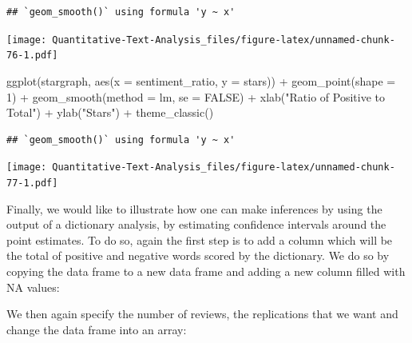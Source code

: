 \documentclass[
]{book}
\newenvironment{Shaded}{\begin{snugshade}}{\end{snugshade}}
\newcommand{\AttributeTok}[1]{\textcolor[rgb]{0.77,0.63,0.00}{#1}}
\newcommand{\ConstantTok}[1]{\textcolor[rgb]{0.00,0.00,0.00}{#1}}
\newcommand{\DecValTok}[1]{\textcolor[rgb]{0.00,0.00,0.81}{#1}}
\newcommand{\FunctionTok}[1]{\textcolor[rgb]{0.00,0.00,0.00}{#1}}
\newcommand{\NormalTok}[1]{#1}
\newcommand{\OtherTok}[1]{\textcolor[rgb]{0.56,0.35,0.01}{#1}}
\newcommand{\SpecialCharTok}[1]{\textcolor[rgb]{0.00,0.00,0.00}{#1}}
\newcommand{\StringTok}[1]{\textcolor[rgb]{0.31,0.60,0.02}{#1}}
\begin{document}
\begin{verbatim}
## `geom_smooth()` using formula 'y ~ x'
\end{verbatim}

\texttt{[image: Quantitative-Text-Analysis\_files/figure-latex/unnamed-chunk-76-1.pdf]}

\begin{Shaded}
\begin{Highlighting}[]
\FunctionTok{ggplot}\NormalTok{(stargraph, }\FunctionTok{aes}\NormalTok{(}\AttributeTok{x =}\NormalTok{ sentiment\_ratio, }\AttributeTok{y =}\NormalTok{ stars)) }\SpecialCharTok{+} \FunctionTok{geom\_point}\NormalTok{(}\AttributeTok{shape =} \DecValTok{1}\NormalTok{) }\SpecialCharTok{+}
    \FunctionTok{geom\_smooth}\NormalTok{(}\AttributeTok{method =}\NormalTok{ lm, }\AttributeTok{se =} \ConstantTok{FALSE}\NormalTok{) }\SpecialCharTok{+} \FunctionTok{xlab}\NormalTok{(}\StringTok{"Ratio of Positive to Total"}\NormalTok{) }\SpecialCharTok{+}
    \FunctionTok{ylab}\NormalTok{(}\StringTok{"Stars"}\NormalTok{) }\SpecialCharTok{+} \FunctionTok{theme\_classic}\NormalTok{()}
\end{Highlighting}
\end{Shaded}

\begin{verbatim}
## `geom_smooth()` using formula 'y ~ x'
\end{verbatim}

\texttt{[image: Quantitative-Text-Analysis\_files/figure-latex/unnamed-chunk-77-1.pdf]}

Finally, we would like to illustrate how one can make inferences by using the output of a dictionary analysis, by estimating confidence intervals around the point estimates. To do so, again the first step is to add a column which will be the total of positive and negative words scored by the dictionary. We do so by copying the data frame to a new data frame and adding a new column filled with NA values:

\begin{Shaded}
\end{Shaded}

We then again specify the number of reviews, the replications that we want and change the data frame into an array:
\end{document}
